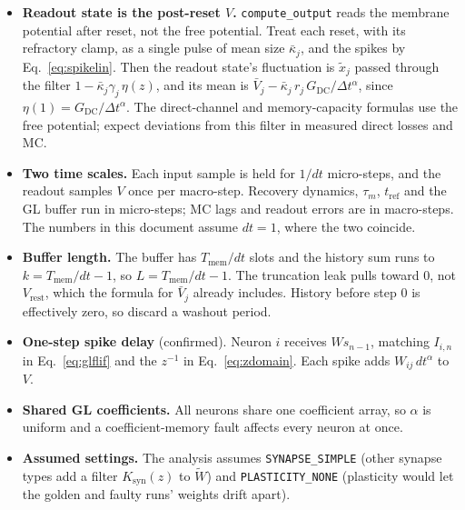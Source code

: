 \documentclass[11pt,a4paper]{article}
\newcommand{\Wt}{\tilde W}
\newcommand{\xtil}{\tilde x}
\begin{document}
\begin{itemize}
  \item \textbf{Readout state is the post-reset $V$.} \texttt{compute\_output} reads the membrane potential after reset, not the free potential. Treat each reset, with its refractory clamp, as a single pulse of mean size $\bar\kappa_j$, and the spikes by Eq.~\eqref{eq:spikelin}. Then the readout state's fluctuation is $\xtil_j$ passed through the filter $1 - \bar\kappa_j \gamma_j\, \eta(z)$, and its mean is $\bar V_j - \bar\kappa_j\, r_j\, G_{\mathrm{DC}}/\Delta t^{\alpha}$, since $\eta(1) = G_{\mathrm{DC}}/\Delta t^{\alpha}$. The direct-channel and memory-capacity formulas use the free potential; expect deviations from this filter in measured direct losses and MC.
  \item \textbf{Two time scales.} Each input sample is held for $1/dt$ micro-steps, and the readout samples $V$ once per macro-step. Recovery dynamics, $\tau_m$, $t_{\mathrm{ref}}$ and the GL buffer run in micro-steps; MC lags and readout errors are in macro-steps. The numbers in this document assume $dt = 1$, where the two coincide.
  \item \textbf{Buffer length.} The buffer has $T_{\mathrm{mem}}/dt$ slots and the history sum runs to $k = T_{\mathrm{mem}}/dt - 1$, so $L = T_{\mathrm{mem}}/dt - 1$. The truncation leak pulls toward 0, not $V_{\mathrm{rest}}$, which the formula for $\bar V_j$ already includes. History before step 0 is effectively zero, so discard a washout period.
  \item \textbf{One-step spike delay} (confirmed). Neuron $i$ receives $W s_{n-1}$, matching $I_{i,n}$ in Eq.~\eqref{eq:glflif} and the $z^{-1}$ in Eq.~\eqref{eq:zdomain}. Each spike adds $W_{ij}\,dt^{\alpha}$ to $V$.
  \item \textbf{Shared GL coefficients.} All neurons share one coefficient array, so $\alpha$ is uniform and a coefficient-memory fault affects every neuron at once.
  \item \textbf{Assumed settings.} The analysis assumes \texttt{SYNAPSE\_SIMPLE} (other synapse types add a filter $K_{\mathrm{syn}}(z)$ to $\Wt$) and \texttt{PLASTICITY\_NONE} (plasticity would let the golden and faulty runs' weights drift apart).
\end{itemize}
\end{document}
